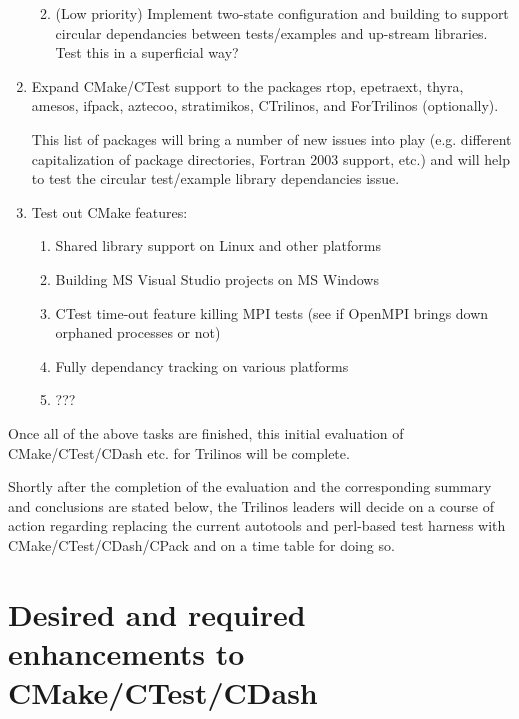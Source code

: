 \documentclass[pdf,ps2pdf,11pt]{SANDreport}
\begin{document}
\begin{enumerate}
\begin{enumerate}
  {}\item (Low priority) Implement two-state configuration and
  building to support circular dependancies between tests/examples and
  up-stream libraries.  Test this in a superficial way?

  \end{enumerate}

{}\item Expand CMake/CTest support to the packages rtop, epetraext,
thyra, amesos, ifpack, aztecoo, stratimikos, CTrilinos, and
ForTrilinos (optionally).

This list of packages will bring a number of new issues into play
(e.g. different capitalization of package directories, Fortran 2003
support, etc.)  and will help to test the circular test/example
library dependancies issue.

{}\item Test out CMake features:

  \begin{enumerate}

  {}\item Shared library support on Linux and other platforms

  {}\item Building MS Visual Studio projects on MS Windows

  {}\item CTest time-out feature killing MPI tests (see if OpenMPI
  brings down orphaned processes or not)

  {}\item Fully dependancy tracking on various platforms

  {}\item ???

  \end{enumerate}

\end{enumerate}

Once all of the above tasks are finished, this initial evaluation of
CMake/CTest/CDash etc. for Trilinos will be complete.

Shortly after the completion of the evaluation and the corresponding
summary and conclusions are stated below, the Trilinos leaders will
decide on a course of action regarding replacing the current autotools
and perl-based test harness with CMake/CTest/CDash/CPack and on a time
table for doing so.

%
\section{Desired and required enhancements to CMake/CTest/CDash}
%
\end{document}
